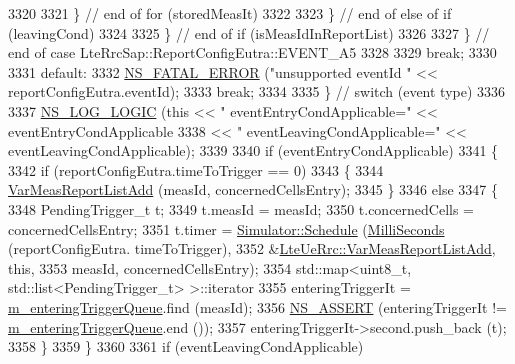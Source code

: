 \begin{DoxyCode}
3320 
3321                   \} \textcolor{comment}{// end of for (storedMeasIt)}
3322 
3323               \} \textcolor{comment}{// end of else of if (leavingCond)}
3324 
3325           \} \textcolor{comment}{// end of if (isMeasIdInReportList)}
3326 
3327       \} \textcolor{comment}{// end of case LteRrcSap::ReportConfigEutra::EVENT\_A5}
3328 
3329       \textcolor{keywordflow}{break};
3330 
3331     \textcolor{keywordflow}{default}:
3332       \hyperlink{group__fatal_ga5131d5e3f75d7d4cbfd706ac456fdc85}{NS\_FATAL\_ERROR} (\textcolor{stringliteral}{"unsupported eventId "} << reportConfigEutra.eventId);
3333       \textcolor{keywordflow}{break};
3334 
3335     \} \textcolor{comment}{// switch (event type)}
3336 
3337   \hyperlink{group__logging_ga88acd260151caf2db9c0fc84997f45ce}{NS\_LOG\_LOGIC} (\textcolor{keyword}{this} << \textcolor{stringliteral}{" eventEntryCondApplicable="} << eventEntryCondApplicable
3338                      << \textcolor{stringliteral}{" eventLeavingCondApplicable="} << eventLeavingCondApplicable);
3339 
3340   \textcolor{keywordflow}{if} (eventEntryCondApplicable)
3341     \{
3342       \textcolor{keywordflow}{if} (reportConfigEutra.timeToTrigger == 0)
3343         \{
3344           \hyperlink{classns3_1_1LteUeRrc_ab92644dec3b28bb546bf95f616f674b1}{VarMeasReportListAdd} (measId, concernedCellsEntry);
3345         \}
3346       \textcolor{keywordflow}{else}
3347         \{
3348           PendingTrigger\_t t;
3349           t.measId = measId;
3350           t.concernedCells = concernedCellsEntry;
3351           t.timer = \hyperlink{classns3_1_1Simulator_a671882c894a08af4a5e91181bf1eec13}{Simulator::Schedule} (\hyperlink{group__timecivil_gaf26127cf4571146b83a92ee18679c7a9}{MilliSeconds} (reportConfigEutra.
      timeToTrigger),
3352                                          &\hyperlink{classns3_1_1LteUeRrc_ab92644dec3b28bb546bf95f616f674b1}{LteUeRrc::VarMeasReportListAdd}, \textcolor{keyword}{
      this},
3353                                          measId, concernedCellsEntry);
3354           std::map<uint8\_t, std::list<PendingTrigger\_t> >::iterator
3355             enteringTriggerIt = \hyperlink{classns3_1_1LteUeRrc_a06a26d8b08a9c635d7fa6ff8381fff4f}{m\_enteringTriggerQueue}.find (measId);
3356           \hyperlink{assert_8h_a6dccdb0de9b252f60088ce281c49d052}{NS\_ASSERT} (enteringTriggerIt != \hyperlink{classns3_1_1LteUeRrc_a06a26d8b08a9c635d7fa6ff8381fff4f}{m\_enteringTriggerQueue}.end ());
3357           enteringTriggerIt->second.push\_back (t);
3358         \}
3359     \}
3360 
3361   \textcolor{keywordflow}{if} (eventLeavingCondApplicable)

\end{DoxyCode}
